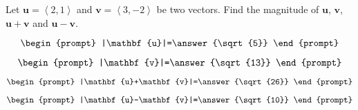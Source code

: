 \documentclass{ximera}
\author{Gregory Hartman \and Matthew Carr}
\begin{document}
\begin{exercise}




Let $\mathbf{u}=\left\langle2,1\right\rangle$ and $\mathbf{v}=\left\langle3,-2\right\rangle$ be two vectors. Find the magnitude of $\mathbf{u}$, $\mathbf{v}$, $\mathbf{u}+\mathbf{v}$ and $\mathbf{u}-\mathbf{v}$.

\[
\begin{prompt}
|\mathbf{u}|=\answer{\sqrt{5}}
\end{prompt}
\]

\[
\begin{prompt}
|\mathbf{v}|=\answer{\sqrt{13}}
\end{prompt}
\]

\[
\begin{prompt}
|\mathbf{u}+\mathbf{v}|=\answer{\sqrt{26}}
\end{prompt}
\]

\[
\begin{prompt}
|\mathbf{u}-\mathbf{v}|=\answer{\sqrt{10}}
\end{prompt}
\]


\end{exercise}
\end{document}
